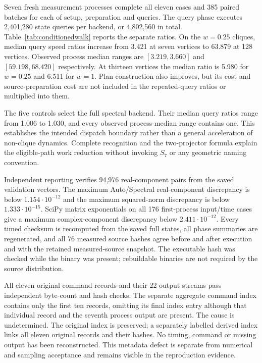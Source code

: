 \documentclass[11pt,a4paper]{article}
\theoremstyle{definition}\newtheorem{definition}[theorem]{Definition}
\begin{document}
Seven fresh measurement processes complete all eleven cases and 385 paired
batches for each of setup, preparation and queries. The query phase executes
2,401,280 state queries per backend, or 4,802,560 in total. Table~\ref{tab:conditionedwalk}
reports the separate ratios. On the $w=0.25$ cliques, median query speed ratios
increase from 3.421 at seven vertices to 63.879 at 128 vertices. Observed process
median ranges are $[3.219,3.660]$ and $[59.198,68.420]$ respectively. At thirteen
vertices the median ratio is 5.980 for $w=0.25$ and 6.511 for $w=1$. Plan
construction also improves, but its cost and source-preparation cost are not
included in the repeated-query ratios or multiplied into them.

The five controls select the full spectral backend. Their median query ratios
range from 1.006 to 1.030, and every observed process-median range contains one.
This establishes the intended dispatch boundary rather than a general
acceleration of non-clique dynamics. Complete recognition and the two-projector
formula explain the eligible-path work reduction without invoking $S_7$ or
any geometric naming convention.

Independent reporting verifies 94,976 real-component pairs from the saved
validation vectors. The maximum Auto/Spectral real-component discrepancy is below
$1.154\cdot10^{-12}$ and the maximum squared-norm discrepancy is below
$1.333\cdot10^{-15}$. SciPy matrix exponentials on all 176 first-process
input/time cases give a maximum complex-component discrepancy below
$2.411\cdot10^{-12}$. Every timed checksum is recomputed from the saved full
states, all phase summaries are regenerated, and all 76 measured source hashes
agree before and after execution and with the retained measured-source snapshot. The executable
hash was checked while the binary was present; rebuildable binaries are not
required by the source distribution.

All eleven original command records and their 22 output streams pass independent
byte-count and hash checks. The separate aggregate command index contains only
the first ten records, omitting its final index entry although that individual
record and the seventh process output are present. The cause is undetermined.
The original index is preserved; a separately labelled derived index links all
eleven original records and their hashes. No timing, command or missing output
has been reconstructed. This metadata defect is separate from numerical and
sampling acceptance and remains visible in the reproduction evidence.
\end{document}
